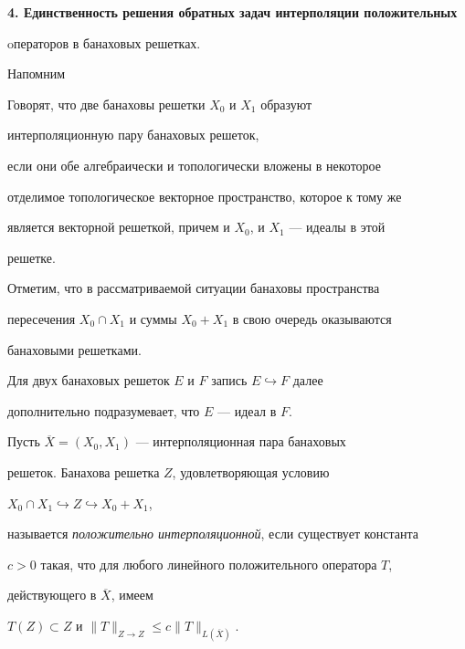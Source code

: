 {\bf 4. Единственность решения обратных задач интерполяции положительных 


oператоров в банаховых решетках.}


Напомним





\begin{defn}


Говорят, что две банаховы решетки $X_0$ и $X_1$ образуют {\it 


интерполяционную пару банаховых решеток,} 


если они обе алгебраически и топологически вложены в некоторое 


отделимое топологическое векторное пространство, которое к тому же 


является векторной решеткой, причем и $X_0$, и $X_1$ --- идеалы в этой 


решетке.     


\end{defn}





Отметим, что в рассматриваемой ситуации банаховы пространства 


пересечения $X_0 \cap X_1$ и суммы $X_0 + X_1$ в свою очередь оказываются 


банаховыми решетками. 





Для двух банаховых решеток $E$ и $F$ запись $E \hookrightarrow F$ далее 


дополнительно подразумевает, что $E$ --- идеал в $F$.





\begin{defn}


Пусть $\overline X = (X_0, X_1)$ --- интерполяционная пара банаховых 


решеток. Банахова решетка $Z$, удовлетворяющая условию


$X_0 \cap X_1 \hookrightarrow Z \hookrightarrow X_0 + X_1$, 


называется {\it положительно интерполяционной}, если существует константа 


$c>0$ такая, что для любого линейного положительного оператора $T$, 


действующего в $\overline X$, имеем


$T(Z) \subset Z$ и $\| T \| _{Z \to Z} \le c \| T \| _{L(\overline X)}.$


\end{defn}





